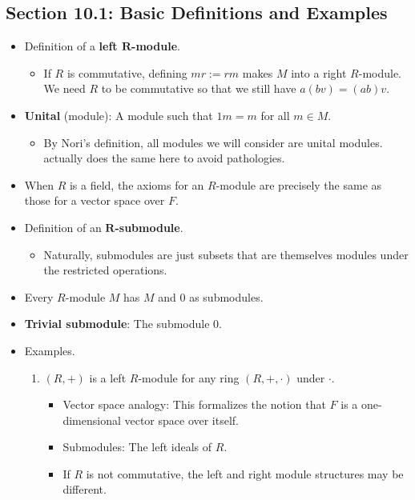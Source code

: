 \documentclass[../notes.tex]{subfiles}
\begin{document}
\subsection*{Section 10.1: Basic Definitions and Examples}
\begin{itemize}
    \item Definition of a \textbf{left $\bm{R}$-module}.
    \begin{itemize}
        \item If $R$ is commutative, defining $mr:=rm$ makes $M$ into a right $R$-module. We need $R$ to be commutative so that we still have $a(bv)=(ab)v$.
    \end{itemize}
    \item \textbf{Unital} (module): A module such that $1m=m$ for all $m\in M$.
    \begin{itemize}
        \item By Nori's definition, all modules we will consider are unital modules. \textcite{bib:DummitFoote} actually does the same here to avoid pathologies.
    \end{itemize}
    \item When $R$ is a field, the axioms for an $R$-module are precisely the same as those for a vector space over $F$.
    \item Definition of an \textbf{$\bm{R}$-submodule}.
    \begin{itemize}
        \item Naturally, submodules are just subsets that are themselves modules under the restricted operations.
    \end{itemize}
    \item Every $R$-module $M$ has $M$ and 0 as submodules.
    \item \textbf{Trivial submodule}: The submodule 0.
    \item Examples.
    \begin{enumerate}
        \item $(R,+)$ is a left $R$-module for any ring $(R,+,\cdot)$ under $\cdot$.
        \begin{itemize}
            \item Vector space analogy: This formalizes the notion that $F$ is a one-dimensional vector space over itself.
            \item Submodules: The left ideals of $R$.
            \item If $R$ is not commutative, the left and right module structures may be different.
        \end{itemize}

\end{enumerate}
\end{itemize}
\end{document}
